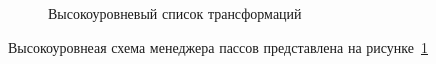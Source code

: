 \begin{figure}[ht]
    \caption{Высокоуровневый список трансформаций}\label{fig:highlevel-mgr}
\end{figure}

Высокоуровнеая схема менеджера пассов представлена на рисунке~\cref{fig:highlevel-mgr}

